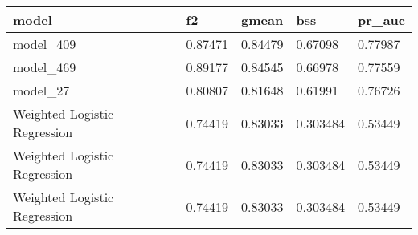 \begin{tabular}{|l|l|l|l|l|}
\hline
\textbf{model}               & \textbf{f2} & \textbf{gmean} & \textbf{bss} & \textbf{pr\_auc} \\ \hline
model\_409                   & 0.87471     & 0.84479        & 0.67098      & 0.77987          \\ \hline
model\_469                   & 0.89177     & 0.84545        & 0.66978      & 0.77559          \\ \hline
model\_27                    & 0.80807     & 0.81648        & 0.61991      & 0.76726          \\ \hline
Weighted Logistic Regression & 0.74419     & 0.83033        & 0.303484     & 0.53449          \\ \hline
Weighted Logistic Regression & 0.74419     & 0.83033        & 0.303484     & 0.53449          \\ \hline
Weighted Logistic Regression & 0.74419     & 0.83033        & 0.303484     & 0.53449          \\ \hline
\end{tabular}